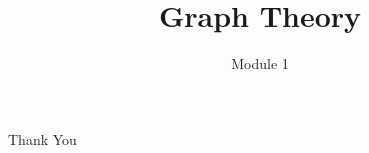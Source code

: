 \documentclass{beamer}
\title{Graph Theory}
\author{Module 1}
\institute{Section 9 : Graph Products}
\begin{document}
\begin{frame}
	\maketitle
\end{frame}

\begin{frame}
	\tableofcontents
\end{frame}

\begin{frame}
	\vspace{0.6in}
	\hspace{3cm} {\color{blue}\Huge{Thank You}}
\end{frame}
\end{document}
